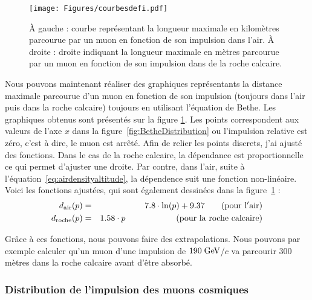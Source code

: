 \documentclass[a4paper, 12pt]{article}
\begin{document}
\begin{spacing}{1.5}
\begin{figure}[t]
\begin{center}
\texttt{[image: Figures/courbesdefi.pdf]}
\caption{\label{fig:BethePoints} À gauche : courbe représentant la longueur maximale en kilomètres parcourue par un muon en fonction de son impulsion dans l'air. À droite : droite indiquant la longueur maximale en mètres parcourue par un muon en fonction de son impulsion dans de la roche calcaire.}
\end{center}
\end{figure}

Nous pouvons maintenant réaliser des graphiques représentants la distance maximale parcourue d'un muon en fonction de son impulsion (toujours dans l'air puis dans la roche calcaire) toujours en utilisant l'équation de Bethe. Les graphiques obtenus sont présentés sur la figure \ref{fig:BethePoints}. Les points correspondent aux valeurs de l'axe $x$ dans la figure~\ref{fig:BetheDistribution} ou l'impulsion relative est zéro, c'est à dire, le muon est arrêté. Afin de relier les points discrets, j'ai ajusté des fonctions. Dans le cas de la roche calcaire, la dépendance est proportionnelle ce qui permet d'ajuster une droite. Par contre, dans l'air, suite à l'équation~\ref{eq:airdensityaltitude}, la dépendence suit une fonction non-linéaire. Voici les fonctions ajustées, qui sont également dessinées dans la figure~\ref{fig:BethePoints} :
\begin{eqnarray}
    d_{\rm air}(p) &=& 7.8\cdot\ln(p) + 9.37~~~\;~~   {\rm (pour~l'air)} \\
    d_{\rm roche}(p) &=& 1.58\cdot p ~~~~~~~~~~~~~~~~~~  {\rm (pour~la~roche~calcaire)}
\label{eq:rochedroiteprojection}
\end{eqnarray}

Grâce à ces fonctions, nous pouvons faire des extrapolations. Nous pouvons par exemple calculer qu'un muon d'une impulsion de $190\;{\rm GeV}$/$c$ va parcourir 300 mètres dans la roche calcaire avant d'être absorbé.

\subsubsection{Distribution de l'impulsion des muons cosmiques}


\end{spacing}
\end{document}
